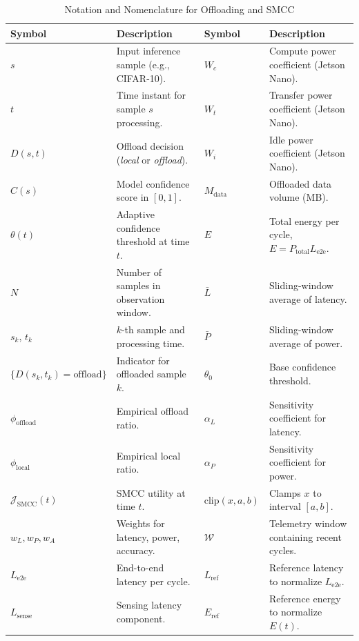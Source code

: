 \documentclass[journal]{IEEEtran}
\newcommand{\revblue}[1]{\textcolor{revblue}{#1}}
\begin{document}
\begin{table}[!t]
\centering
\caption{Notation and Nomenclature for Offloading and SMCC}
\label{tab:nssonn-notation}
\small
\renewcommand{\arraystretch}{1.1}
\setlength{\tabcolsep}{4pt}
\begin{tabular}{|p{1.8cm}|p{5.7cm}|p{1.8cm}|p{5.7cm}|}
\hline
\textbf{Symbol} & \textbf{Description} & \textbf{Symbol} & \textbf{Description} \\
\hline
$s$ & Input inference sample (e.g., CIFAR-10). & 
$W_c$ & Compute power coefficient (Jetson Nano). \\
\hline
$t$ & Time instant for sample $s$ processing. & 
$W_t$ & Transfer power coefficient (Jetson Nano). \\
\hline
$D(s,t)$ & Offload decision (\textit{local} or \textit{offload}). & 
$W_i$ & Idle power coefficient (Jetson Nano). \\
\hline
$C(s)$ & Model confidence score in $[0,1]$. & 
$M_{\text{data}}$ & Offloaded data volume (MB). \\
\hline
$\theta(t)$ & Adaptive confidence threshold at time $t$. & 
$E$ & Total energy per cycle, $E = P_{\text{total}} L_{\text{e2e}}$. \\
\hline
$N$ & Number of samples in observation window. & 
$\bar{L}$ & Sliding-window average of latency. \\
\hline
$s_k$, $t_k$ & $k$-th sample and processing time. & 
$\bar{P}$ & Sliding-window average of power. \\
\hline
$\{D(s_k,t_k)\!=\!\text{offload}\}$ & Indicator for offloaded sample $k$. & 
$\theta_0$ & Base confidence threshold. \\
\hline
$\phi_{\text{offload}}$ & Empirical offload ratio. & 
$\alpha_L$ & Sensitivity coefficient for latency. \\
\hline
$\phi_{\text{local}}$ & Empirical local ratio. & 
$\alpha_P$ & Sensitivity coefficient for power. \\
\hline
$\mathcal{J}_{\mathrm{SMCC}}(t)$ & SMCC utility at time $t$. & 
$\mathrm{clip}(x,a,b)$ & Clamps $x$ to interval $[a,b]$. \\
\hline
$w_L, w_P, w_A$ & Weights for latency, power, accuracy. & 
$\mathcal{W}$ & Telemetry window containing recent cycles. \\
\hline
$L_{\text{e2e}}$ & End-to-end latency per cycle. & 
\revblue{$L_{\text{ref}}$} & \revblue{Reference latency to normalize $L_{\text{e2e}}$.} \\
\hline
$L_{\text{sense}}$ & Sensing latency component. & 
\revblue{$E_{\text{ref}}$} & \revblue{Reference energy to normalize $E(t)$.} \\

\end{tabular}
\end{table}
\end{document}
